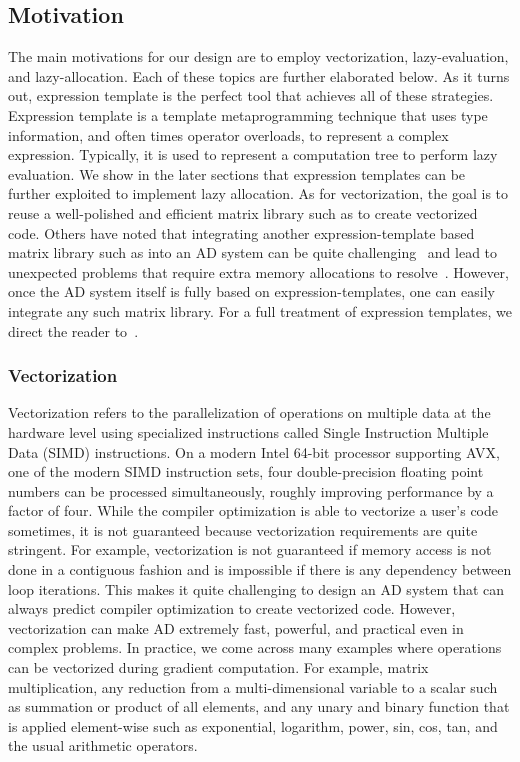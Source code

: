 \subsection{Motivation}\label{ssec:motivation}

The main motivations for our design are to employ vectorization, lazy-evaluation, and lazy-allocation.
Each of these topics are further elaborated below.
As it turns out, expression template is the perfect tool that achieves
all of these strategies.
Expression template is a template metaprogramming technique that 
uses type information, and often times operator overloads, to represent a complex expression.
Typically, it is used to represent a computation tree to perform lazy evaluation.
We show in the later sections that expression templates can be further exploited
to implement lazy allocation.
As for vectorization, the goal is to reuse a well-polished and efficient
matrix library such as  to create vectorized code.
Others have noted that integrating another expression-template based matrix library 
such as  into an AD system can be quite challenging~\cite{hogan:2014}
and lead to unexpected problems that require extra memory allocations to resolve~\cite{carpenter:2015}.
However, once the AD system itself is fully based on expression-templates,
one can easily integrate any such matrix library.
For a full treatment of expression templates, 
we direct the reader to~\cite{vandevoorde:2002}.

\subsubsection{Vectorization}

Vectorization refers to the parallelization of operations on multiple data at the hardware level 
using specialized instructions called Single Instruction Multiple Data (SIMD) instructions.
On a modern Intel 64-bit processor supporting AVX, one of the modern SIMD instruction sets,
four double-precision floating point numbers can be processed simultaneously,
roughly improving performance by a factor of four.
While the compiler optimization is able to vectorize a user's code sometimes, it is not guaranteed
because vectorization requirements are quite stringent. 
For example, vectorization is not guaranteed if memory access is not done in a contiguous fashion
and is impossible if there is any dependency between loop iterations.
This makes it quite challenging to design an AD system that 
can always predict compiler optimization to create vectorized code.
However, vectorization can make AD extremely fast, powerful, and practical even in complex problems.
In practice, we come across many examples where operations can be vectorized during gradient computation.
For example, matrix multiplication, any reduction from a multi-dimensional variable to a scalar such as
summation or product of all elements, and any unary and binary function that is applied element-wise such as
exponential, logarithm, power, sin, cos, tan, and the usual arithmetic operators.

